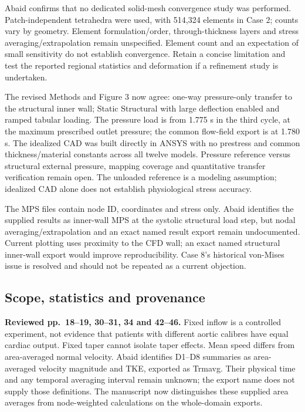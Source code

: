 \documentclass[11pt,a4paper]{article}
\begin{document}
Abaid confirms that no dedicated solid-mesh convergence study was performed. Patch-independent tetrahedra were used, with 514,324 elements in Case 2; counts vary by geometry. Element formulation/order, through-thickness layers and stress averaging/extrapolation remain unspecified. Element count and an expectation of small sensitivity do not establish convergence. Retain a concise limitation and test the reported regional statistics and deformation if a refinement study is undertaken.

The revised Methods and Figure 3 now agree: one-way pressure-only transfer to the structural inner wall; Static Structural with large deflection enabled and ramped tabular loading. The pressure load is from 1.775 s in the third cycle, at the maximum prescribed outlet pressure; the common flow-field export is at 1.780 s. The idealized CAD was built directly in ANSYS with no prestress and common thickness/material constants across all twelve models. Pressure reference versus structural external pressure, mapping coverage and quantitative transfer verification remain open. The unloaded reference is a modeling assumption; idealized CAD alone does not establish physiological stress accuracy.

The MPS files contain node ID, coordinates and stress only. Abaid identifies the supplied results as inner-wall MPS at the systolic structural load step, but nodal averaging/extrapolation and an exact named result export remain undocumented. Current plotting uses proximity to the CFD wall; an exact named structural inner-wall export would improve reproducibility. Case 8's historical von-Mises issue is resolved and should not be repeated as a current objection.

\subsection{Scope, statistics and provenance}

\textbf{Reviewed pp.~18--19, 30--31, 34 and 42--46.} Fixed inflow is a controlled experiment, not evidence that patients with different aortic calibres have equal cardiac output. Fixed taper cannot isolate taper effects. Mean speed differs from area-averaged normal velocity. Abaid identifies D1--D8 summaries as area-averaged velocity magnitude and TKE, exported as Trmavg. Their physical time and any temporal averaging interval remain unknown; the export name does not supply those definitions. The manuscript now distinguishes these supplied area averages from node-weighted calculations on the whole-domain exports.
\end{document}

